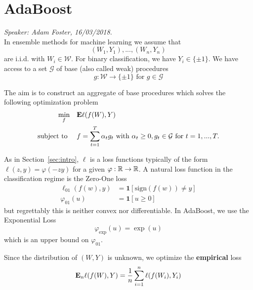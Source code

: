 
\chapter{AdaBoost}
\emph{Speaker: Adam Foster, 16/03/2018.}\\

In ensemble methods for machine learning we assume that
\begin{equation*}
	(W_1, Y_1), ..., (W_n, Y_n)
\end{equation*}
are i.i.d. with $W_i \in \mathcal{W}$. For binary classification, we have $Y_i \in \{\pm 1\}$. We have access to a set $\mathcal{G}$ of base (also called weak) procedures
\begin{equation*}
	g: \mathcal{W} \to \{\pm 1\} \text{ for } g \in \mathcal{G}
\end{equation*}

The aim is to construct an aggregate of base procedures which solves the following optimization problem
\begin{align*}
	\begin{aligned}
		\min_f\quad   & \mathbf{E} \ell(f(W), Y) \\
		\text{subject to }\quad & f = \sum_{t=1}^T \alpha_t g_t \text{ with } \alpha_t \ge 0, g_t \in \mathcal{G} \text{ for } t=1, ..., T.
	\end{aligned}
\end{align*}

As in Section~\ref{sec:intro}, $\ell$ is a loss functions typically of the form $\ell(z,y) = \varphi(-zy)$ for a given $\varphi:\mathbb{R}\rightarrow\mathbb{R}$. A natural loss function in the classification regime is the Zero-One loss
\begin{align*}
	\ell_{01}(f(w), y) &= \mathbf{1}[\text{sign}(f(w)) \ne y] \\
	\varphi_{01}(u)    &= \mathbf{1}[u \ge 0]
\end{align*}
but regrettably this is neither convex nor differentiable. In AdaBoost, we use the Exponential Loss 
\begin{equation*}
	\varphi_\text{exp}(u) = \exp(u)
\end{equation*}
which is an upper bound on $\varphi_{01}$.

Since the distribution of $(W, Y)$ is unknown, we optimize the \textbf{empirical} loss
\begin{equation*}
	\mathbf{E}_n \ell(f(W), Y) = \frac{1}{n} \sum_{i=1}^n \ell(f(W_i), Y_i)
\end{equation*}



